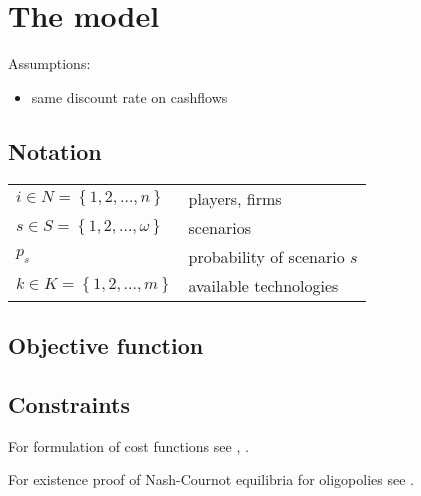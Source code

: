 \section{The model}

Assumptions:

\begin{itemize}
	\item same discount rate on cashflows
\end{itemize}

\subsection{Notation}

\begin{longtable}[c]{l l}
$i\in N=\left\{ 1,2,\dots,n\right\}$ & players, firms\\
$s\in S=\left\{ 1,2,\dots,\omega\right\}$ & scenarios\\
$p_s$ & probability of scenario $s$\\
$k\in K=\left\{ 1,2,\dots,m\right\}$ & available technologies
\end{longtable}

\subsection{Objective function}

\subsection{Constraints}

For formulation of cost functions see \cite{Bergman1995}, \cite{Pineau2003}.	

For existence proof of Nash-Cournot equilibria for oligopolies see \cite{Murphy1982}.



